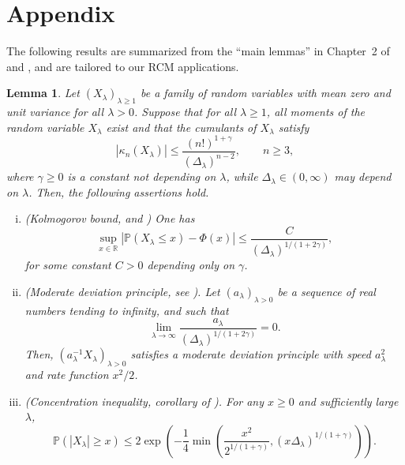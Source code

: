\documentclass[12pt]{article}
\newcommand{\R}{\mathbb{R}}
\newcommand{\IP}{\mathbb{P}}
\newtheorem{lemma}[prop]{Lemma}
\numberwithin{equation}{section}
\begin{document}
\appendix

\section{Appendix}
\noindent 
The following results are summarized from the ``main lemmas'' in Chapter~2 of \cite{saulis} and \cite{doring}, and are tailored to our RCM applications.
\begin{lemma}
  \label{l1}
  Let $(X_\lambda)_{\lambda \geq 1}$ be a family of random variables with mean zero and unit variance for all $\lambda>0$. Suppose that for all $\lambda \geq 1$, all moments of the random variable $X_\lambda$ exist and that %
  the cumulants of $X_\lambda$ satisfy  
  \begin{equation}
    \label{Statuleviciuscond2}
    |\kappa_n (X_\lambda)|\le\frac{(n!)^{1+\gamma}}{(\Delta_\lambda)^{n-2}},
    \qquad
 n\ge3, 
\end{equation}
  where $\gamma\ge0$ is a constant not depending on $\lambda$, while $\Delta_\lambda\in(0,\infty)$ may depend on $\lambda$.
   Then, the following assertions hold.
\begin{enumerate}[i)]
\item (Kolmogorov bound,
 \cite[Corollary~2.1]{saulis} and \cite[Theorem~2.4]{doering})
  One has
\begin{equation}
\sup_{x\in\R}|\IP(X_\lambda\leq x)-\Phi(x)|\leq \frac{C}{(\Delta_\lambda)^{1/(1+2\gamma)}},
\end{equation}
for some constant $C>0$ depending only on $\gamma$.
\item (Moderate deviation principle,
  see \cite[Theorem~1.1]{doring}).
  Let $( a_\lambda )_{\lambda > 0}$ be a sequence of real numbers tending to infinity, and such that 
  $$
  \lim_{\lambda \to \infty}
  \frac{a_\lambda}{(\Delta_\lambda)^{1/(1+2\gamma)}}
  = 0.
  $$
  Then, $ (a_\lambda^{-1}X_\lambda)_{\lambda >0}$ satisfies a moderate deviation principle with speed $a_\lambda^2$ and rate function $x^2/2$. 
\item (Concentration inequality,
  corollary of \cite[Lemma~2.4]{saulis}).
  For any $x\ge0$ and sufficiently large $\lambda$, 
\begin{equation}
\IP(|X_\lambda|\geq x)\le2\exp\left(-\frac14\min\left( \frac{x^2}{2^{1/(1+\gamma)}},(x\Delta_\lambda)^{1/(1+\gamma)}\right) \right).
\end{equation} 

\end{enumerate}
\end{lemma}
\end{document}

